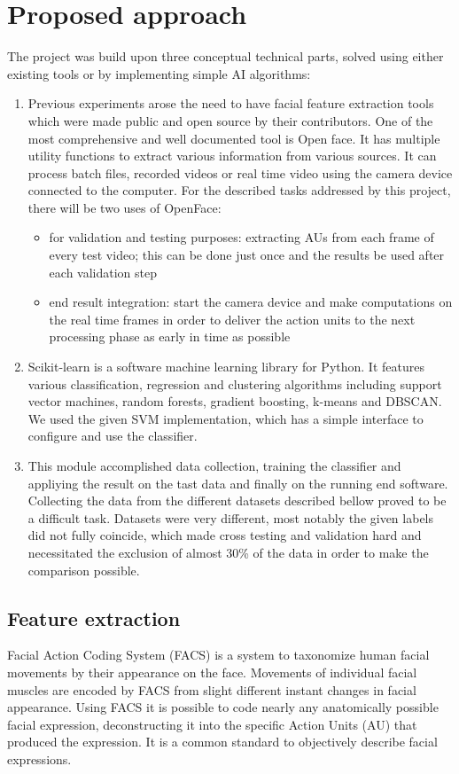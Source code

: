 \documentclass[runningheads,a4paper,11pt]{report}
\begin{document}
\chapter{Proposed approach}
\label{chapter:proposedApproach}

The project was build upon three conceptual technical parts, solved using either existing tools or by implementing simple AI algorithms:

\begin{enumerate}
\item Previous experiments arose the need to have facial feature extraction tools which were made public and open source by their contributors. One of the most comprehensive and well documented tool is Open face. It has multiple utility functions to extract various information from various sources. It can process batch files, recorded videos or real time video using the camera device connected to the computer. For the described tasks addressed by this project, there will be two uses of OpenFace:
    \begin{itemize}
        \item for validation and testing purposes: extracting AUs from each frame of every test video; this can be done just once and the results be used after each validation step
        \item end result integration: start the camera device and make computations on the real time frames in order to deliver the action units to the next processing phase as early in time as possible
    \end{itemize}
\item Scikit-learn is a software machine learning library for Python. It features various classification, regression and clustering algorithms including support vector machines, random forests, gradient boosting, k-means and DBSCAN. We used the given SVM implementation, which has a simple interface to configure and use the classifier.
\item This module accomplished data collection, training the classifier and appliying the result on the tast data and finally on the running end software. Collecting the data from the different datasets described bellow proved to be a difficult task. Datasets were very different, most notably the given labels did not fully coincide, which made cross testing and validation hard and necessitated the exclusion of almost 30\% of the data in order to make the comparison possible.
\end{enumerate}
\section{Feature extraction}
Facial Action Coding System (FACS) is a system to taxonomize human facial movements by their appearance on the face. Movements of individual facial muscles are encoded by FACS from slight different instant changes in facial appearance. Using FACS it is possible to code nearly any anatomically possible facial expression, deconstructing it into the specific Action Units (AU) that produced the expression. It is a common standard to objectively describe facial expressions.

\end{document}
